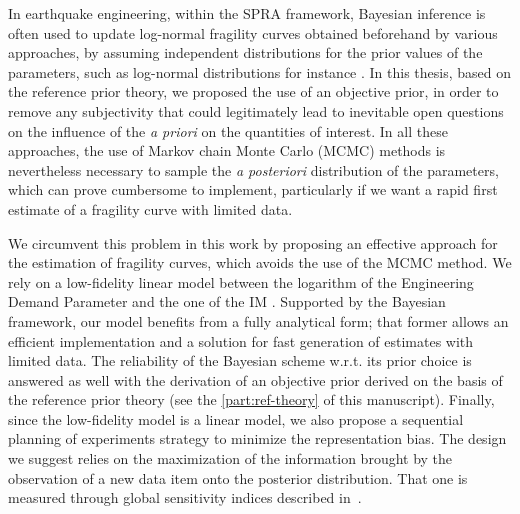 In earthquake engineering, within the SPRA framework, Bayesian inference is often used to update log-normal fragility curves obtained beforehand by various approaches, by assuming independent distributions for the prior values of the parameters, such as log-normal distributions for instance \citep{tadinada_structural_2017,kwag_computationally_2018,wang_seismic_2018,katayama_bayesian-estimation-based_2021,straub_improved_2008}. In this thesis, based on the reference prior theory, we proposed the use of an objective prior, in order to remove any subjectivity that could legitimately lead to inevitable open questions on the influence of the \emph{a priori} on the quantities of interest. In all these approaches, the use of Markov chain Monte Carlo (MCMC) methods is nevertheless necessary to sample the \emph{a posteriori} distribution of the parameters, which can prove cumbersome to implement, particularly if we want a rapid first estimate of a fragility curve with limited data. 


We circumvent this problem in this work by proposing an effective approach for the estimation of fragility curves, which avoids the use of the MCMC method. We rely on a low-fidelity linear model between the logarithm of the Engineering Demand Parameter and the one of the IM \citep{lallemant_statistical_2015,hariri-ardebili_probabilistic_2016,zentner_fragility_2017,ghosh_seismic_2020}. Supported by the Bayesian framework, our model benefits from a fully analytical form; that former allows an efficient implementation and a solution for fast generation of estimates with limited data. The reliability of the Bayesian scheme w.r.t.{ }its prior choice is answered as well with the derivation of an objective prior derived on the basis of the reference prior theory (see the \cref{part:ref-theory} of this manuscript). Finally, since the low-fidelity model is a linear model, we also propose a sequential planning of experiments strategy to minimize the representation bias. 
The design we suggest relies on the maximization of the information brought by the observation of a new data item onto the posterior distribution. That one is measured through global sensitivity indices described in~\cite{da_veiga_global_2015}.


